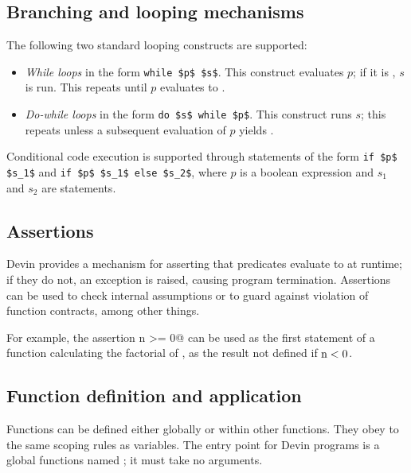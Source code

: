 \documentclass[UdineBachThesis,american,11pt]{PhdThesis}
\begin{document}
  \subsection{Branching and looping mechanisms}

  The following two standard looping constructs are supported:

  \begin{itemize}
    \item \emph{While loops} in the form \lstinline[mathescape]@while $p$ $s$@.
    This construct evaluates $p$; if it is \lstinline@true@, $s$ is run. This
    repeats until $p$ evaluates to \lstinline@false@.

    \item \emph{Do-while loops} in the form
    \lstinline[mathescape]@do $s$ while $p$@. This construct runs $s$; this
    repeats unless a subsequent evaluation of $p$ yields \lstinline@false@.
  \end{itemize}

  Conditional code execution is supported through statements of the form
  \lstinline[mathescape]@if $p$ $s_1$@ and
  \lstinline[mathescape]@if $p$ $s_1$ else $s_2$@, where $p$ is a boolean
  expression and $s_1$ and $s_2$ are statements.

  \subsection{Assertions}

  Devin provides a mechanism for asserting that predicates evaluate to
  \lstinline@true@ at runtime; if they do not, an exception is raised, causing
  program termination. Assertions can be used to check internal assumptions or
  to guard against violation of function contracts, among other things.

  For example, the assertion \lstinline@assert n >= 0@ can be used as the first
  statement of a function calculating the factorial of \lstinline@n@, as the
  result not defined if $\text{\lstinline@n@} < 0$.

  \subsection{Function definition and application}

  Functions can be defined either globally or within other functions. They obey
  to the same scoping rules as variables. The entry point for Devin programs is
  a global functions named \lstinline@main@; it must take no arguments.
\end{document}
